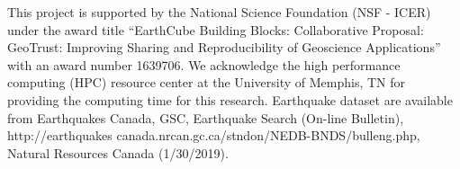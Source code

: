 \documentclass[draft]{agujournal2018}
\begin{document}
\acknowledgments
This project is supported by the National Science Foundation (NSF - ICER) under the award title ``EarthCube Building Blocks: Collaborative Proposal: GeoTrust: Improving Sharing and Reproducibility of Geoscience Applications'' with an award number 1639706. We acknowledge the high performance computing (HPC) resource center at the University of Memphis, TN for providing the computing time for this research. Earthquake dataset are available from Earthquakes Canada, GSC, Earthquake Search (On-line Bulletin), http://earthquakes canada.nrcan.gc.ca/stndon/NEDB-BNDS/bulleng.php, Natural Resources Canada (1/30/2019).






    




%
%
%
%
%
%
%
%
\end{document}
